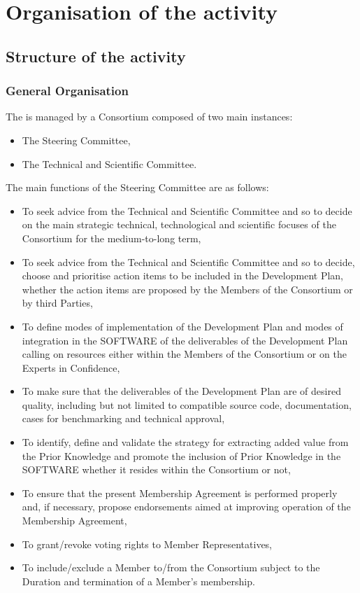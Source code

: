\chapter{Organisation of the \telemacsystem activity}

\section{Structure of the \telemacsystem activity}

\subsection{General Organisation}

The \telemacsystem is managed by a Consortium composed of two main instances:
\begin{itemize}
\item The Steering Committee,
\item The Technical and Scientific Committee.
\end{itemize}

The main functions of the Steering Committee are as follows:
\begin{itemize}
\item To seek advice from the Technical and Scientific Committee and so to
decide on the main strategic technical, technological and scientific focuses of
the Consortium for the medium-to-long term,
\item To seek advice from the Technical and Scientific Committee and so to
decide, choose and prioritise action items to be included in the Development
Plan, whether the action items are proposed by the Members of the Consortium or
by third Parties,
\item To define modes of implementation of the Development Plan and modes of
integration in the SOFTWARE of the deliverables of the Development Plan calling
on resources either within the Members of the Consortium or on the Experts in
Confidence,
\item To make sure that the deliverables of the Development Plan are of desired
quality, including but not limited to compatible source code, documentation,
cases for benchmarking and technical approval,
\item To identify, define and validate the strategy for extracting added value
from the Prior Knowledge and promote the inclusion of Prior Knowledge in the
SOFTWARE whether it resides within the Consortium or not,
\item To ensure that the present Membership Agreement is performed properly
and, if necessary, propose endorsements aimed at improving operation of the
Membership Agreement,
\item To grant/revoke voting rights to Member Representatives,
\item To include/exclude a Member to/from the Consortium subject to the
Duration and termination of a Member's membership.
\end{itemize}

